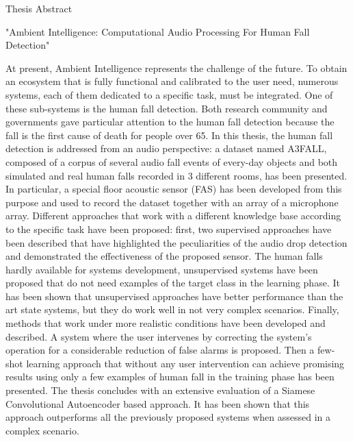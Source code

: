\documentclass[]{letter}
\begin{document}

\begin{letter}{Thesis Abstract}
\opening{"Ambient Intelligence:
Computational Audio Processing
For Human Fall Detection"}

At present, Ambient Intelligence represents the challenge of the future. To obtain an ecosystem that is fully functional and calibrated to the user need, numerous systems, each of them dedicated to a specific task, must be integrated. One of these sub-systems is the human fall detection. Both research community and governments gave particular attention to the human fall detection because the fall is the first cause of death for people over 65. In this thesis, the human fall detection is addressed from an audio perspective: a dataset named A3FALL, composed of a corpus of several audio fall events of every-day objects and both simulated and real human falls recorded in 3 different rooms, has been presented. In particular, a special floor acoustic sensor (FAS) has been developed from this purpose and used to record the dataset together with an array of a microphone array.
Different approaches that work with a different knowledge base according to the specific task have been proposed: first, two supervised approaches have been described that have highlighted the peculiarities of the audio drop detection and demonstrated the effectiveness of the proposed sensor.
The human falls hardly available for systems development, unsupervised systems have been proposed that do not need examples of the target class in the learning phase. It has been shown that unsupervised approaches have better performance than the art state systems, but they do work well in not very complex scenarios.
Finally, methods that work under more realistic conditions have been developed and described. A system where the user intervenes by correcting the system's operation for a considerable reduction of false alarms is proposed. Then a few-shot learning approach that without any user intervention can achieve promising results using only a few examples of human fall in the training phase has been presented. The thesis concludes with an extensive evaluation of a Siamese Convolutional Autoencoder based approach. It has been shown that this approach outperforms all the previously proposed systems when assessed in a complex scenario.


\signature{Fabio Vesperini}



\end{letter}
\end{document}
